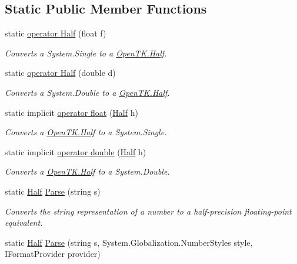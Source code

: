 \subsection*{Static Public Member Functions}
\begin{DoxyCompactItemize}
\item 
static \hyperlink{struct_open_t_k_1_1_half_ab20fd9bb592e416910677c30a7692e1f}{operator Half} (float f)
\begin{DoxyCompactList}\small\item\em Converts a System.\-Single to a \hyperlink{struct_open_t_k_1_1_half}{Open\-T\-K.\-Half}. \end{DoxyCompactList}\item 
static \hyperlink{struct_open_t_k_1_1_half_a0adddbbc87aebdd985a1b5edcd007774}{operator Half} (double d)
\begin{DoxyCompactList}\small\item\em Converts a System.\-Double to a \hyperlink{struct_open_t_k_1_1_half}{Open\-T\-K.\-Half}. \end{DoxyCompactList}\item 
static implicit \hyperlink{struct_open_t_k_1_1_half_a7f11c593114c947e81db6a0ba23636b3}{operator float} (\hyperlink{struct_open_t_k_1_1_half}{Half} h)
\begin{DoxyCompactList}\small\item\em Converts a \hyperlink{struct_open_t_k_1_1_half}{Open\-T\-K.\-Half} to a System.\-Single. \end{DoxyCompactList}\item 
static implicit \hyperlink{struct_open_t_k_1_1_half_a74cea29f9d511639d8d8da315c58db44}{operator double} (\hyperlink{struct_open_t_k_1_1_half}{Half} h)
\begin{DoxyCompactList}\small\item\em Converts a \hyperlink{struct_open_t_k_1_1_half}{Open\-T\-K.\-Half} to a System.\-Double. \end{DoxyCompactList}\item 
static \hyperlink{struct_open_t_k_1_1_half}{Half} \hyperlink{struct_open_t_k_1_1_half_a1710507d8370e593608fe6120474280a}{Parse} (string s)
\begin{DoxyCompactList}\small\item\em Converts the string representation of a number to a half-\/precision floating-\/point equivalent.\end{DoxyCompactList}\item 
static \hyperlink{struct_open_t_k_1_1_half}{Half} \hyperlink{struct_open_t_k_1_1_half_abf624a13c5967007843c7597d283c5aa}{Parse} (string s, System.\-Globalization.\-Number\-Styles style, I\-Format\-Provider provider)

\end{DoxyCompactItemize}
